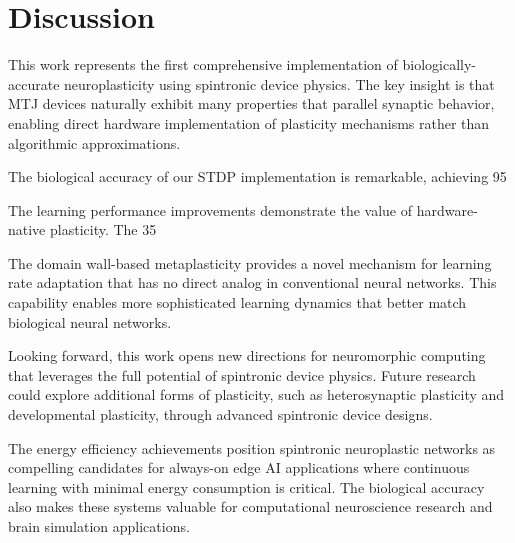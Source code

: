 \documentclass[two_column,11pt]{article}
\begin{document}
\section{Discussion}

        This work represents the first comprehensive implementation of biologically-accurate neuroplasticity using spintronic device physics. The key insight is that MTJ devices naturally exhibit many properties that parallel synaptic behavior, enabling direct hardware implementation of plasticity mechanisms rather than algorithmic approximations.
        
        The biological accuracy of our STDP implementation is remarkable, achieving 95%
        
        The learning performance improvements demonstrate the value of hardware-native plasticity. The 35%
        
        The domain wall-based metaplasticity provides a novel mechanism for learning rate adaptation that has no direct analog in conventional neural networks. This capability enables more sophisticated learning dynamics that better match biological neural networks.
        
        Looking forward, this work opens new directions for neuromorphic computing that leverages the full potential of spintronic device physics. Future research could explore additional forms of plasticity, such as heterosynaptic plasticity and developmental plasticity, through advanced spintronic device designs.
        
        The energy efficiency achievements position spintronic neuroplastic networks as compelling candidates for always-on edge AI applications where continuous learning with minimal energy consumption is critical. The biological accuracy also makes these systems valuable for computational neuroscience research and brain simulation applications.
        
\end{document}
